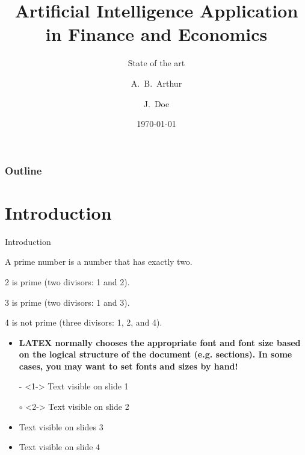\documentclass[10pt]{beamer}
\title{Artificial Intelligence Application in Finance and Economics}
\subtitle{State of the art}
\author[Arthur, Doe] %
{A.~B.~Arthur\inst{1} \and J.~Doe\inst{2}}
\institute[VFU] %
{
	\inst{1}%
	Faculty of Physics\\
	Very Famous University
	\and
	\inst{2}%
	Faculty of Chemistry\\
	Very Famous University
}
\date{\today}
\newcommand\Background{%
	\begin{tikzpicture}[remember picture,overlay]
		\node[inner sep=0pt,outer sep=0pt,opacity=0.1]
		at (current page.center)
		{\texttt{[image: img/bg]}};
	\end{tikzpicture}
}
\begin{document}
	
	\begin{frame}
		\initclock %
		\titlepage
	\end{frame}
	
	\begin{frame}
		\frametitle{Outline}
		\tableofcontents
	\end{frame}

	\section{Introduction}
	\begin{frame}{Introduction}
		\begin{definition}
			\small {A \alert{prime number} is a number that has exactly two.}
		\end{definition}
		
		\begin{example}
			\begin{itemize}
				\small{
				\item 2 is prime (two divisors: 1 and 2).
				\item 3 is prime (two divisors: 1 and 3).
				\item 4 is not prime (\alert{three} divisors: 1, 2, and 4).}
			\end{itemize}
		\end{example}
		\begin{itemize}
			\setbeamertemplate{itemize items}[ball]
			
			\item {\small \bf LATEX normally chooses the appropriate font and font size based on the logical structure of the document (e.g. sections). In some cases, you may want to set fonts and sizes by hand!}
			\item[-]<1-> Text visible on slide 1
			\item[$\circ$]<2-> Text visible on slide 2
			\item<3> Text visible on slides 3
			\item<4-> Text visible on slide 4
		\end{itemize}
	\end{frame}
\end{document}

